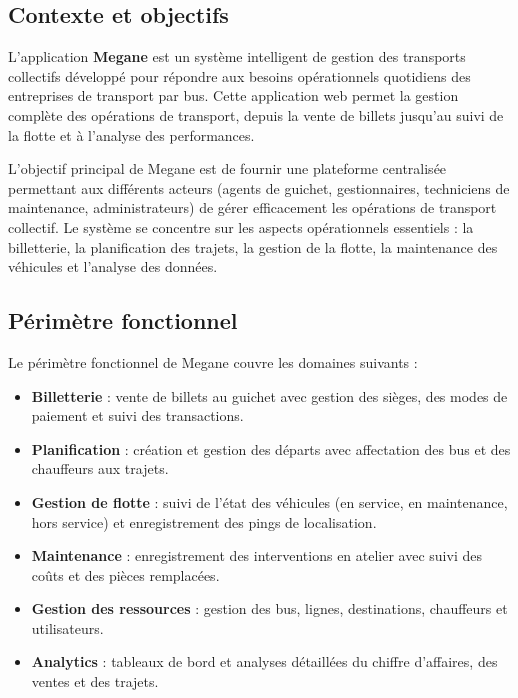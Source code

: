 \documentclass[a4paper, 12pt]{book}
\begin{document}
\subsection{Contexte et objectifs}

L'application \textbf{Megane} est un système intelligent de gestion des transports collectifs développé pour répondre aux besoins opérationnels quotidiens des entreprises de transport par bus. Cette application web permet la gestion complète des opérations de transport, depuis la vente de billets jusqu'au suivi de la flotte et à l'analyse des performances.

L'objectif principal de Megane est de fournir une plateforme centralisée permettant aux différents acteurs (agents de guichet, gestionnaires, techniciens de maintenance, administrateurs) de gérer efficacement les opérations de transport collectif. Le système se concentre sur les aspects opérationnels essentiels : la billetterie, la planification des trajets, la gestion de la flotte, la maintenance des véhicules et l'analyse des données.

\subsection{Périmètre fonctionnel}

Le périmètre fonctionnel de Megane couvre les domaines suivants :

\begin{itemize}
    \item \textbf{Billetterie} : vente de billets au guichet avec gestion des sièges, des modes de paiement et suivi des transactions.
    \item \textbf{Planification} : création et gestion des départs avec affectation des bus et des chauffeurs aux trajets.
    \item \textbf{Gestion de flotte} : suivi de l'état des véhicules (en service, en maintenance, hors service) et enregistrement des pings de localisation.
    \item \textbf{Maintenance} : enregistrement des interventions en atelier avec suivi des coûts et des pièces remplacées.
    \item \textbf{Gestion des ressources} : gestion des bus, lignes, destinations, chauffeurs et utilisateurs.
    \item \textbf{Analytics} : tableaux de bord et analyses détaillées du chiffre d'affaires, des ventes et des trajets.
\end{itemize}
\end{document}
